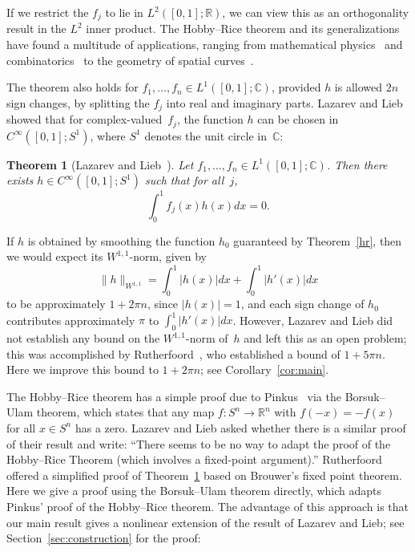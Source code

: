 \documentclass[11pt, reqno, english]{amsart}
\theoremstyle{plain}
\newtheorem{theorem}{Theorem}[section]
\theoremstyle{definition}
\newcommand{\R}{\mathbb{R}}
\newcommand{\C}{\mathbb{C}}
\begin{document}
If we restrict the $f_{j}$ to lie in $L^{2}([0, 1]; \R)$, we can view this as
an orthogonality result in the $L^{2}$ inner product.
The Hobby--Rice theorem and its generalizations have found a multitude of
applications, ranging from mathematical physics~\cite{lieb2013} and 
combinatorics~\cite{alon1987} to the geometry of spatial curves~\cite{aslam2018}.

The theorem also holds for $f_{1}, \ldots , f_{n} \in L^{1}([0, 1];
\mathbb{C})$, provided $h$ is allowed $2n$ sign changes, by splitting the
$f_{j}$ into real and imaginary parts. Lazarev and Lieb showed that for
complex-valued~$f_{j}$, the function $h$ can be chosen in $C^{\infty}([0, 1];
S^{1})$, where $S^{1}$ denotes the unit circle in~$\C$:

\begin{theorem}[Lazarev and Lieb~\cite{lazarev2013}]\label{ll}
  Let $f_{1}, \ldots , f_{n} \in L^{1}([0, 1]; \C)$. Then there exists $h \in
  C^{\infty}([0, 1]; S^{1})$ such that for all~$j$,
  $$\int_{0}^{1}f_{j}(x)h(x)dx = 0.$$
\end{theorem}

If $h$ is obtained by smoothing the function $h_{0}$ guaranteed by
Theorem~\ref{hr}, then we would expect its $W^{1, 1}$-norm, given by
$$\|h\|_{W^{1, 1}} = \int_{0}^{1}|h(x)|dx + \int_{0}^{1}|h'(x)|dx$$
to be approximately $1 + 2 \pi n$, since $|h(x)| = 1$, and each sign change of
$h_{0}$ contributes approximately $\pi$ to $\int_{0}^{1}|h'(x)|dx$. However,
Lazarev and Lieb did not establish any bound on the $W^{1, 1}$-norm of~$h$
and left this as an open problem; this was accomplished by Rutherfoord~\cite{rutherfoord2013}, 
who established a bound of $1 + 5 \pi n$. Here we improve this bound to $1 + 2 \pi n$;
see Corollary~\ref{cor:main}.

The Hobby--Rice theorem has a simple proof due to Pinkus~\cite{pinkus1976} via the Borsuk--Ulam
theorem, which states that any map $f\colon S^{n} \rightarrow \R^{n}$ with
$f(-x) = -f(x)$ for all $x \in S^{n}$ has a zero. 
Lazarev and Lieb asked whether there is a similar proof of their result and write:
``There seems to be no way to adapt the proof of the Hobby--Rice Theorem
 (which involves a fixed-point argument).'' Rutherfoord~\cite{rutherfoord2013} offered a simplified proof of Theorem~\ref{ll} based on Brouwer's fixed point theorem. Here we give a proof using the Borsuk--Ulam theorem directly, which adapts Pinkus' proof of the Hobby--Rice theorem. The advantage of this approach is that our main 
result gives a nonlinear extension of the result of Lazarev and Lieb; see Section~\ref{sec:construction} for the proof:
\end{document}
